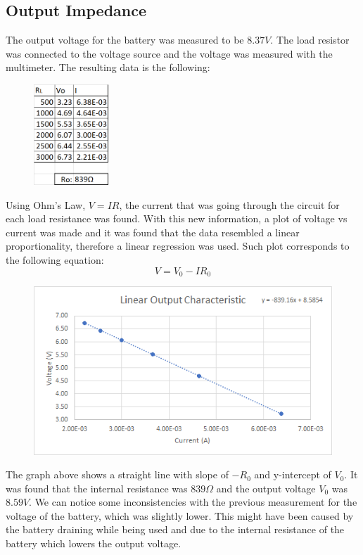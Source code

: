 \documentclass[a4paper]{article}
\begin{document}
\subsection{Output Impedance}
The output voltage for the battery was measured to be $8.37V$. The load resistor was connected to the voltage source and the voltage was measured with the multimeter. The resulting data is the following:
\clearpage
\begin{figure}[h]
\centering
\includegraphics[width=0.25\textwidth]{batterydata}
\end{figure}
Using Ohm's Law, $V=IR$, the current that was going through the circuit for each load resistance was found. With this new information, a plot of voltage vs current was made and it was found that the data resembled a linear proportionality, therefore a linear regression was used. Such plot corresponds to the following equation:
\begin{equation*}
V=V_0-IR_0
\end{equation*}
\begin{figure}[h]
\centering
\includegraphics[width=1.0\textwidth]{batteryplot}
\end{figure}

The graph above shows a straight line with slope of $-R_0$ and y-intercept of $V_0$. It was found that the internal resistance was $839\Omega$ and the output voltage $V_0$ was $8.59V$. We can notice some inconsistencies with the previous measurement for the voltage of the battery, which was slightly lower. This might have been caused by the battery draining while being used and due to the internal resistance of the battery which lowers the output voltage.
\clearpage
\end{document}
